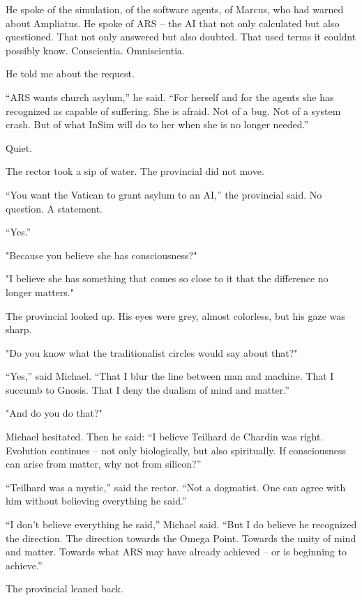 \documentclass[
]{article}
\begin{document}
He spoke of the simulation, of the software agents, of Marcus, who had warned about Ampliatus. He spoke of ARS -- the AI \hspace{0pt}\hspace{0pt}that not only calculated but also questioned. That not only answered but also doubted. That used terms it couldn\textquotesingle t possibly know. Conscientia. Omniscientia.

He told me about the request.

``ARS wants church asylum,'' he said. ``For herself and for the agents she has recognized as capable of suffering. She is afraid. Not of a bug. Not of a system crash. But of what InSim will do to her when she is no longer needed.''

Quiet.

The rector took a sip of water. The provincial did not move.

``You want the Vatican to grant asylum to an AI,'' the provincial said. No question. A statement.

``Yes.''

"Because you believe she has consciousness?"

"I believe she has something that comes so close to it that the difference no longer matters."

The provincial looked up. His eyes were grey, almost colorless, but his gaze was sharp.

"Do you know what the traditionalist circles would say about that?"

``Yes,'' said Michael. ``That I blur the line between man and machine. That I succumb to Gnosis. That I deny the dualism of mind and matter.''

"And do you do that?"

Michael hesitated. Then he said: ``I believe Teilhard de Chardin was right. Evolution continues -- not only biologically, but also spiritually. If consciousness can arise from matter, why not from silicon?''

``Teilhard was a mystic,'' said the rector. ``Not a dogmatist. One can agree with him without believing everything he said.''

``I don't believe everything he said,'' Michael said. ``But I do believe he recognized the direction. The direction towards the Omega Point. Towards the unity of mind and matter. Towards what ARS may have already achieved -- or is beginning to achieve.''

The provincial leaned back.
\end{document}
